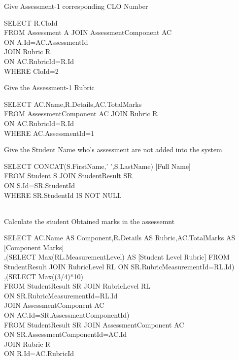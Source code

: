 \documentclass[10pt,a4paper]{article}
\newenvironment{problem}[2][Problem]{\begin{trivlist}
\item[\hskip \labelsep {\bfseries #1}\hskip \labelsep {\bfseries #2.}]}{\end{trivlist}}
\begin{document}
\begin{problem}{6}
Give Assessment-1 corresponding CLO Number 
\end{problem}
SELECT R.CloId\\
FROM Assessment A JOIN AssessmentComponent AC\\
ON A.Id=AC.AssessmentId\\
JOIN Rubric R\\
ON AC.RubricId=R.Id\\
WHERE CloId=2\\

\begin{problem}{7}
Give the Assessment-1 Rubric
\end{problem}
SELECT AC.Name,R.Details,AC.TotalMarks\\
FROM AssessmentComponent AC JOIN Rubric R\\
ON AC.RubricId=R.Id\\
WHERE AC.AssessmentId=1

\begin{problem}{8}
Give the Student Name who's assessment are not added into the system
\end{problem}
SELECT CONCAT(S.FirstName,' ',S.LastName) [Full Name]\\
FROM Student S JOIN StudentResult SR\\
ON S.Id=SR.StudentId\\
WHERE SR.StudentId IS NOT NULL\\\

\begin{problem}{9}
Calculate the student Obtained marks in the assessemnt 
\end{problem}
SELECT AC.Name AS Component,R.Details AS Rubric,AC.TotalMarks AS [Component Marks]\\
,(SELECT Max(RL.MeasurementLevel) AS [Student Level Rubric]
FROM StudentResult JOIN RubricLevel RL 
ON SR.RubricMeasurementId=RL.Id)\\
,(SELECT Max((3/4)*10)\\
FROM StudentResult SR JOIN RubricLevel RL\\ 
ON SR.RubricMeasurementId=RL.Id \\
JOIN AssessmentComponent AC\\
ON AC.Id=SR.AssessmentComponentId) \\
FROM StudentResult SR JOIN AssessmentComponent AC  \\
ON  SR.AssessmentComponentId=AC.Id\\
JOIN Rubric R\\
ON R.Id=AC.RubricId
\end{document}

